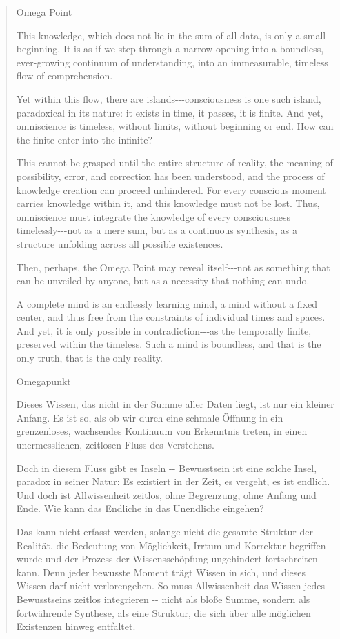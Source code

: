 \documentclass[
  ngerman,
]{article}
\begin{document}
\begin{quote}
Omega Point

This knowledge, which does not lie in the sum of all data, is only a
small beginning. It is as if we step through a narrow opening into a
boundless, ever-growing continuum of understanding, into an
immeasurable, timeless flow of comprehension.

Yet within this flow, there are islands-\/-\/-consciousness is one such
island, paradoxical in its nature: it exists in time, it passes, it is
finite. And yet, omniscience is timeless, without limits, without
beginning or end. How can the finite enter into the infinite?

This cannot be grasped until the entire structure of reality, the
meaning of possibility, error, and correction has been understood, and
the process of knowledge creation can proceed unhindered. For every
conscious moment carries knowledge within it, and this knowledge must
not be lost. Thus, omniscience must integrate the knowledge of every
consciousness timelessly-\/-\/-not as a mere sum, but as a continuous
synthesis, as a structure unfolding across all possible existences.

Then, perhaps, the Omega Point may reveal itself-\/-\/-not as something
that can be unveiled by anyone, but as a necessity that nothing can
undo.

A complete mind is an endlessly learning mind, a mind without a fixed
center, and thus free from the constraints of individual times and
spaces. And yet, it is only possible in contradiction-\/-\/-as the
temporally finite, preserved within the timeless. Such a mind is
boundless, and that is the only truth, that is the only reality.

Omegapunkt

Dieses Wissen, das nicht in der Summe aller Daten liegt, ist nur ein
kleiner Anfang. Es ist so, als ob wir durch eine schmale Öffnung in ein
grenzenloses, wachsendes Kontinuum von Erkenntnis treten, in einen
unermesslichen, zeitlosen Fluss des Verstehens.

Doch in diesem Fluss gibt es Inseln -\/- Bewusstsein ist eine solche
Insel, paradox in seiner Natur: Es existiert in der Zeit, es vergeht, es
ist endlich. Und doch ist Allwissenheit zeitlos, ohne Begrenzung, ohne
Anfang und Ende. Wie kann das Endliche in das Unendliche eingehen?

Das kann nicht erfasst werden, solange nicht die gesamte Struktur der
Realität, die Bedeutung von Möglichkeit, Irrtum und Korrektur begriffen
wurde und der Prozess der Wissensschöpfung ungehindert fortschreiten
kann. Denn jeder bewusste Moment trägt Wissen in sich, und dieses Wissen
darf nicht verlorengehen. So muss Allwissenheit das Wissen jedes
Bewusstseins zeitlos integrieren -\/- nicht als bloße Summe, sondern als
fortwährende Synthese, als eine Struktur, die sich über alle möglichen
Existenzen hinweg entfaltet.


\end{quote}
\end{document}
